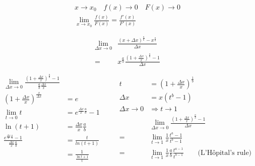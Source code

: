 \documentclass{article}
\begin{document}
  \begin{align} %
    \begin{aligned}
      x \to x_{0} \quad f(x) \to 0 \quad F(x) \to 0 \\
      \lim_{x \to x_{0}}\frac{f(x)}{F(x)} = \frac{f'(x)}{F'(x)} \\
    \end{aligned}
  \end{align}
  \begin{align}
    \begin{aligned}
      \lim_{\Delta{x} \to 0}&\frac{\left(x+\Delta{x}\right)^{\frac{a}{b}} - x^{\frac{a}{b}}}{\Delta{x}} \\
      =& x^{\frac{a}{b}} \frac{ \left( 1 + \frac{\Delta{x}}{x} \right)^{\frac{a}{b}} - 1}{\Delta{x}} \\
    \end{aligned}
  \end{align}
  \[
    \begin{aligned}
      \lim_{\Delta{x} \to 0} \frac{\left( 1 + \frac{\Delta{x}}{x} \right)^{\frac{a}{b}} - 1} {\frac{a}{b} \frac{\Delta{x}}{x}} \\
      \left( 1 + \frac{\Delta{x}}{x} \right)^{\frac{x}{\Delta{x}}} &= e \\
      \lim_{t \to 0} t &= e^{\frac{\Delta{x}}{x} \frac{a}{b}} - 1\\
      \ln \left( t + 1 \right) &= \frac{\Delta{x}}{x} \frac{a}{b} \\
      \frac{e^{\frac{\Delta{x}}{x} \frac{a}{b}} - 1}{\frac{\Delta{x}}{x} \frac{a}{b}} &=
      \frac{t}{ln \left( t + 1 \right)} \\
      &= \frac{1}{\frac{\ln t + 1}{t}}
    \end{aligned}
    \qquad
    \begin{aligned}
      t &= \left(1 + \frac{\Delta{x}}{x} \right)^{\frac{1}{b}} \\
      \Delta{x} &= x \left( t^{b} - 1 \right) \\
      \Delta{x} \to 0 &\Rightarrow t \to 1 \\
      &\lim_{\Delta{x} \to 0} \frac{ \left( 1 + \frac{\Delta{x}}{x} \right)^{\frac{a}{b}} - 1}{\Delta{x}} \\
      = &\lim_{t \to 1} \frac{1}{x} \frac{t^{a} - 1}{t^{b} - 1} \\
      = &\lim_{t \to 1} \frac{1}{x} \frac{a}{b} \frac{t^{a -1}}{t^{b - 1}} \qquad \text{(L'Hôpital's rule)} %
    \end{aligned}
  \]
\end{document}
